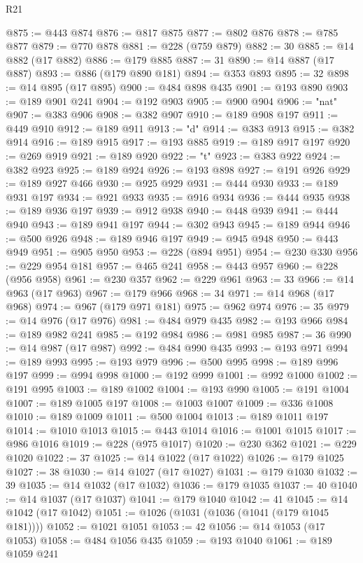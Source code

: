 \begin{lexlean}{R21}
\begin{coremodule}
@875 := @443 @874
@876 := @817 @875
@877 := @802 @876
@878 := @785 @877
@879 := @770 @878
@881 := @228 (@759 @879)
@882 := 30
@885 := @14 @882 (@17 @882)
@886 := @179 @885
@887 := 31
@890 := @14 @887 (@17 @887)
@893 := @886 (@179 @890 @181)
@894 := @353 @893
@895 := 32
@898 := @14 @895 (@17 @895)
@900 := @484 @898 @435
@901 := @193 @890
@903 := @189 @901 @241
@904 := @192 @903
@905 := @900 @904
@906 := "nat"
@907 := @383 @906
@908 := @382 @907
@910 := @189 @908 @197
@911 := @449 @910
@912 := @189 @911
@913 := "d"
@914 := @383 @913
@915 := @382 @914
@916 := @189 @915
@917 := @193 @885
@919 := @189 @917 @197
@920 := @269 @919
@921 := @189 @920
@922 := "t"
@923 := @383 @922
@924 := @382 @923
@925 := @189 @924
@926 := @193 @898
@927 := @191 @926
@929 := @189 @927 @466
@930 := @925 @929
@931 := @444 @930
@933 := @189 @931 @197
@934 := @921 @933
@935 := @916 @934
@936 := @444 @935
@938 := @189 @936 @197
@939 := @912 @938
@940 := @448 @939
@941 := @444 @940
@943 := @189 @941 @197
@944 := @302 @943
@945 := @189 @944
@946 := @500 @926
@948 := @189 @946 @197
@949 := @945 @948
@950 := @443 @949
@951 := @905 @950
@953 := @228 (@894 @951)
@954 := @230 @330
@956 := @229 @954 @181
@957 := @465 @241
@958 := @443 @957
@960 := @228 (@956 @958)
@961 := @230 @357
@962 := @229 @961
@963 := 33
@966 := @14 @963 (@17 @963)
@967 := @179 @966
@968 := 34
@971 := @14 @968 (@17 @968)
@974 := @967 (@179 @971 @181)
@975 := @962 @974
@976 := 35
@979 := @14 @976 (@17 @976)
@981 := @484 @979 @435
@982 := @193 @966
@984 := @189 @982 @241
@985 := @192 @984
@986 := @981 @985
@987 := 36
@990 := @14 @987 (@17 @987)
@992 := @484 @990 @435
@993 := @193 @971
@994 := @189 @993
@995 := @193 @979
@996 := @500 @995
@998 := @189 @996 @197
@999 := @994 @998
@1000 := @192 @999
@1001 := @992 @1000
@1002 := @191 @995
@1003 := @189 @1002
@1004 := @193 @990
@1005 := @191 @1004
@1007 := @189 @1005 @197
@1008 := @1003 @1007
@1009 := @336 @1008
@1010 := @189 @1009
@1011 := @500 @1004
@1013 := @189 @1011 @197
@1014 := @1010 @1013
@1015 := @443 @1014
@1016 := @1001 @1015
@1017 := @986 @1016
@1019 := @228 (@975 @1017)
@1020 := @230 @362
@1021 := @229 @1020
@1022 := 37
@1025 := @14 @1022 (@17 @1022)
@1026 := @179 @1025
@1027 := 38
@1030 := @14 @1027 (@17 @1027)
@1031 := @179 @1030
@1032 := 39
@1035 := @14 @1032 (@17 @1032)
@1036 := @179 @1035
@1037 := 40
@1040 := @14 @1037 (@17 @1037)
@1041 := @179 @1040
@1042 := 41
@1045 := @14 @1042 (@17 @1042)
@1051 := @1026 (@1031 (@1036 (@1041 (@179 @1045 @181))))
@1052 := @1021 @1051
@1053 := 42
@1056 := @14 @1053 (@17 @1053)
@1058 := @484 @1056 @435
@1059 := @193 @1040
@1061 := @189 @1059 @241

\end{coremodule}
\end{lexlean}
